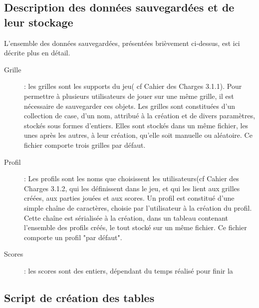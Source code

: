 \documentclass[11pt]{article}
\begin{document}
\subsection{Description des données sauvegardées et de leur stockage}
L'ensemble des données sauvegardées, présentées brièvement ci-dessus, est ici décrite plus en détail.

\begin{description}
    \item [Grille] : les grilles sont les supports du jeu( cf Cahier des Charges 3.1.1). Pour permettre à plusieurs utilisateurs de jouer sur une même grille, il est nécessaire de sauvegarder ces objets. Les grilles sont constituées d'un collection de case, d'un nom, attribué à la création et de divers paramètres, stockés sous formes d'entiers. Elles sont stockés dans un même fichier, les unes après les autres, à leur création, qu'elle soit manuelle ou aléatoire. Ce fichier comporte trois grilles par défaut.
    \item [Profil] : Les profils sont les noms que choisissent les utilisateurs(cf Cahier des Charges 3.1.2, qui les définissent dans le jeu, et qui les lient aux grilles créées, aux parties jouées et aux scores. Un profil est constitué d'une simple chaîne de caractères, choisie par l'utilisateur à la création du profil. Cette chaîne est sérialisée à la création, dans un tableau contenant l'ensemble des profils créés, le tout stocké sur un même fichier. Ce fichier comporte un profil "par défaut".
    \item [Scores] : les scores sont des entiers, dépendant du temps réalisé pour finir la 
\end{description}

\subsection{Script de création des tables}
\end{document}

